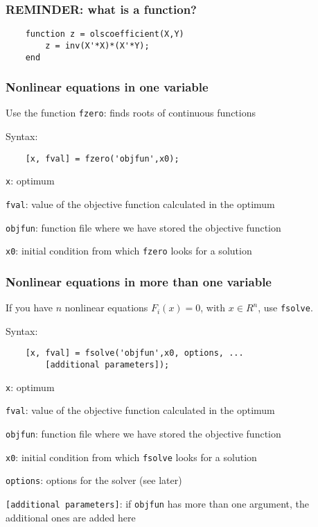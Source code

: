 \documentclass[show notes]{beamer}%
\begin{document}
\begin{frame}[fragile]
\frametitle{REMINDER: what is a function?}


\begin{lstlisting}
    function z = olscoefficient(X,Y)    
    	z = inv(X'*X)*(X'*Y);
    end
\end{lstlisting}


\end{frame}




\begin{frame}[fragile]
\frametitle{Nonlinear equations in one variable}
Use the function \texttt{fzero}: finds roots of continuous functions

Syntax:

\begin{lstlisting}
    [x, fval] = fzero('objfun',x0);
\end{lstlisting}

\texttt{x}: optimum

\texttt{fval}: value of the objective function calculated in the optimum

\texttt{objfun}: function file where we have stored the objective function

\texttt{x0}: initial condition from which \texttt{fzero} looks for a solution


\end{frame}



\begin{frame}[fragile]
\frametitle{Nonlinear equations in more than one variable}

If you have $n$ nonlinear equations $F_i (x) = 0$, with $x \in R^n$, use \texttt{fsolve}.

Syntax:

\begin{lstlisting}
    [x, fval] = fsolve('objfun',x0, options, ...
    	[additional parameters]);
\end{lstlisting}

\texttt{x}: optimum

\texttt{fval}: value of the objective function calculated in the optimum

\texttt{objfun}: function file where we have stored the objective function

\texttt{x0}: initial condition from which \texttt{fsolve} looks for a solution

\texttt{options}: options for the solver (see later)

\texttt{[additional parameters]}: if \texttt{objfun} has more than one argument, the additional ones are added here

\end{frame}
\end{document}
